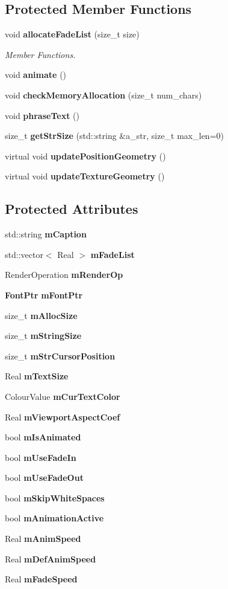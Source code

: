 \subsection*{Protected Member Functions}
\begin{CompactItemize}
\item 
void {\bf allocateFadeList} (size\_\-t size)
\begin{CompactList}\small\item\em Member Functions. \item\end{CompactList}\item 
void {\bf animate} ()
\item 
void {\bf checkMemoryAllocation} (size\_\-t num\_\-chars)
\item 
void {\bf phraseText} ()
\item 
size\_\-t {\bf getStrSize} (std::string \&a\_\-str, size\_\-t max\_\-len=0)
\item 
virtual void {\bf updatePositionGeometry} ()
\item 
virtual void {\bf updateTextureGeometry} ()
\end{CompactItemize}
\subsection*{Protected Attributes}
\begin{CompactItemize}
\item 
std::string {\bf mCaption}
\item 
std::vector$<$ Real $>$ {\bf mFadeList}
\item 
RenderOperation {\bf mRenderOp}
\item 
{\bf FontPtr} {\bf mFontPtr}
\item 
size\_\-t {\bf mAllocSize}
\item 
size\_\-t {\bf mStringSize}
\item 
size\_\-t {\bf mStrCursorPosition}
\item 
Real {\bf mTextSize}
\item 
ColourValue {\bf mCurTextColor}
\item 
Real {\bf mViewportAspectCoef}
\item 
bool {\bf mIsAnimated}
\item 
bool {\bf mUseFadeIn}
\item 
bool {\bf mUseFadeOut}
\item 
bool {\bf mSkipWhiteSpaces}
\item 
bool {\bf mAnimationActive}
\item 
Real {\bf mAnimSpeed}
\item 
Real {\bf mDefAnimSpeed}
\item 
Real {\bf mFadeSpeed}
\end{CompactItemize}
